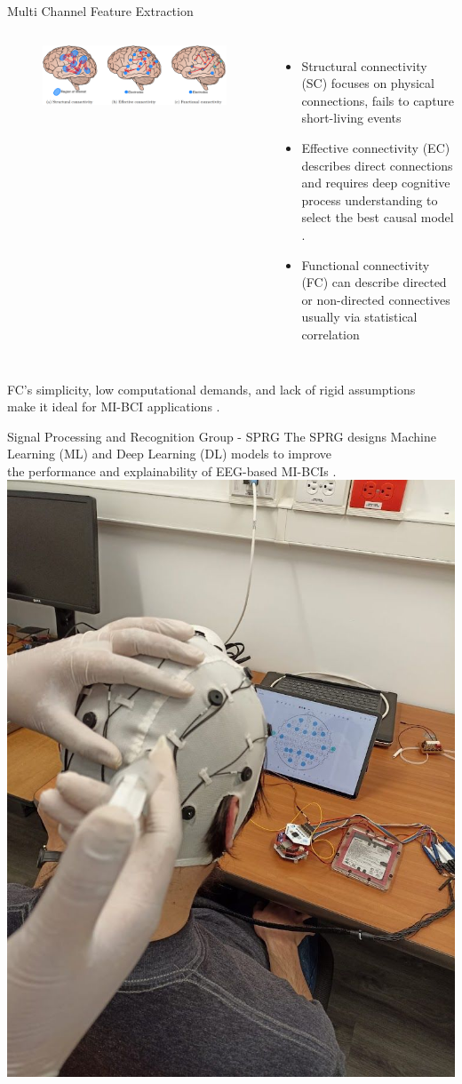 \documentclass[aspectratio=169]{beamer}
\let\oldcite\cite %
\renewcommand{\cite}[1]{{\tiny\oldcite{#1}}}
\begin{document}
\begin{frame}{Multi Channel Feature Extraction}
    \begin{columns}
            \begin{figure}[!ht]
                \centering
                \includegraphics[width=1\linewidth]{figures/connectivities.png}
            \end{figure}
            \begin{itemize}
                \item Structural connectivity (SC) focuses on physical connections, fails to capture short-living events \cite{thiebaut2020brain}
                \item Effective connectivity (EC) describes direct connections and requires deep cognitive process understanding to select the best causal model \cite{chiarion2023connectivity}.
                \item Functional connectivity (FC) can describe directed or non-directed connectives usually via statistical correlation \cite{cao2022brain}
            \end{itemize}
    \end{columns}
    \vspace{3em}
    \centering
    FC's simplicity, low computational demands, and lack of rigid assumptions\\ make it ideal for MI-BCI applications \cite{he2019electrophysiological}.
\end{frame}

\begin{frame}{Signal Processing and Recognition Group - SPRG}
    \centering
    The SPRG designs Machine Learning (ML) and Deep Learning (DL) models to improve\\ the performance and explainability of EEG-based MI-BCIs \cite{collazos2023posthoc}.
    \centering
    \includegraphics[width=0.3\linewidth]{figures/group_img.jpeg}
\end{frame}
\end{document}
